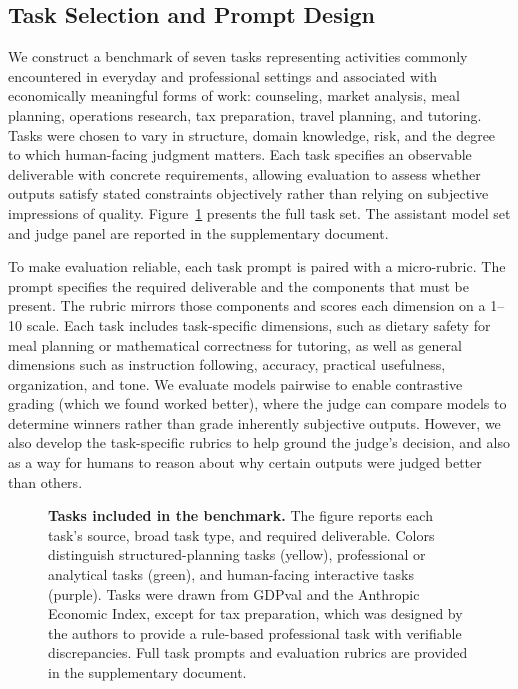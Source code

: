 \subsection{Task Selection and Prompt Design}

We construct a benchmark of seven tasks representing activities commonly encountered in everyday and professional settings and associated with economically meaningful forms of work: counseling, market analysis, meal planning, operations research, tax preparation, travel planning, and tutoring. Tasks were chosen to vary in structure, domain knowledge, risk, and the degree to which human-facing judgment matters. Each task specifies an observable deliverable with concrete requirements, allowing evaluation to assess whether outputs satisfy stated constraints objectively rather than relying on subjective impressions of quality. Figure~\ref{fig:tasks} presents the full task set. The assistant model set and judge panel are reported in the supplementary document.

To make evaluation reliable, each task prompt is paired with a micro-rubric. The prompt specifies the required deliverable and the components that must be present. The rubric mirrors those components and scores each dimension on a 1--10 scale. Each task includes task-specific dimensions, such as dietary safety for meal planning or mathematical correctness for tutoring, as well as general dimensions such as instruction following, accuracy, practical usefulness, organization, and tone. We evaluate models pairwise to enable contrastive grading (which we found worked better), where the judge can compare models to determine winners rather than grade inherently subjective outputs. However, we also develop the task-specific rubrics to help ground the judge's decision, and also as a way for humans to reason about why certain outputs were judged better than others. 


\begin{figure}[htbp]
\centering

\caption{\textbf{Tasks included in the benchmark.}
    The figure reports each task's source, broad task type, and required deliverable. Colors distinguish structured-planning tasks (yellow), professional or analytical tasks (green), and human-facing interactive tasks (purple). Tasks were drawn from GDPval and the Anthropic Economic Index, except for tax preparation, which was designed by the authors to provide a rule-based professional task with verifiable discrepancies. Full task prompts and evaluation rubrics are provided in the supplementary document.}
\label{fig:tasks}
\end{figure}



